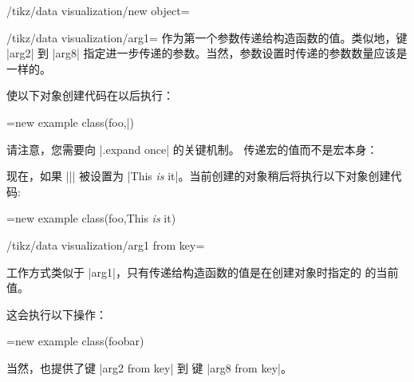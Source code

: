 \begin{key}{/tikz/data visualization/new object=}
\begin{key}{/tikz/data visualization/arg1=}
        作为第一个参数传递给构造函数的值。类似地，键 |arg2| 到 |arg8| 指定进一步传递的参数。当然，参数设置时传递的参数数量应该是一样的。
\begin{codeexample}
\end{codeexample}
        使以下对象创建代码在以后执行：
\begin{codeexample}
\pgfoonew \tikzdvobj=new example class(foo,\bar)
\end{codeexample}
        请注意，您需要向 |.expand once| 的关键机制。 传递宏的值而不是宏本身：
\begin{codeexample}
\end{codeexample}
        现在，如果 |\bar| 被设置为 |This \emph{is} it|。\@ 当前创建的对象稍后将执行以下对象创建代码:
\begin{codeexample}
\pgfoonew \tikzdvobj=new example class(foo,This \emph{is} it)
\end{codeexample}
    \end{key}

    \begin{key}{/tikz/data visualization/arg1 from key=} %

        工作方式类似于 |arg1|，只有传递给构造函数的值是在创建对象时指定的  的当前值。
\begin{codeexample}
\tikzset{some key/.initial=foobar}
\end{codeexample}
        这会执行以下操作：
\begin{codeexample}
\pgfoonew \tikzdvobj=new example class(foobar)
\end{codeexample}
        当然，也提供了键 |arg2 from key| 到 键 |arg8 from key|。
    \end{key}


\end{key}
